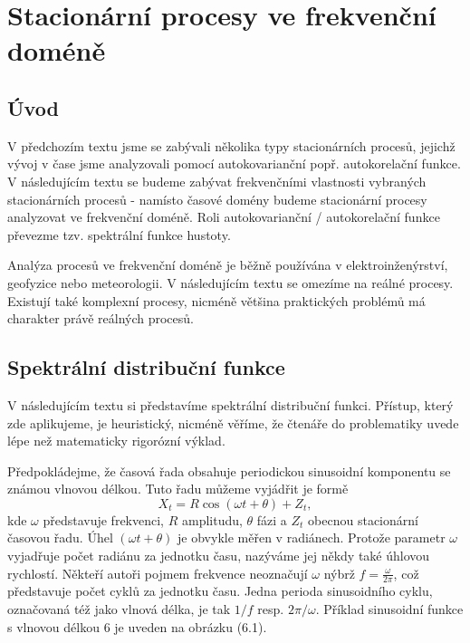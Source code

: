 \chapter{Stacionární procesy ve frekvenční doméně}

\section{Úvod}

V předchozím textu jsme se zabývali několika typy stacionárních procesů, jejichž vývoj v čase jsme analyzovali pomocí autokovarianční popř. autokorelační funkce. V následujícím textu se budeme zabývat frekvenčními vlastnosti vybraných stacionárních procesů - namísto časové domény budeme stacionární procesy analyzovat ve frekvenční doméně. Roli autokovarianční / autokorelační funkce převezme tzv. spektrální funkce hustoty.

Analýza procesů ve frekvenční doméně je běžně používána v elektroinženýrství, geofyzice nebo meteorologii. V následujícím textu se omezíme na reálné procesy. Existují také komplexní procesy, nicméně většina praktických problémů má charakter právě reálných procesů.

\section{Spektrální distribuční funkce}

V následujícím textu si představíme spektrální distribuční funkci. Přístup, který zde aplikujeme, je heuristický, nicméně věříme, že čtenáře do problematiky uvede lépe než matematicky rigorózní výklad.

Předpokládejme, že časová řada obsahuje periodickou sinusoidní komponentu se známou vlnovou délkou. Tuto řadu můžeme vyjádřit je formě
\begin{equation}
X_t = R \cos(\omega t + \theta) + Z_t,
\end{equation}
kde $\omega$ představuje frekvenci, $R$ amplitudu, $\theta$ fázi a $Z_t$ obecnou stacionární časovou řadu. Úhel $(\omega t + \theta)$ je obvykle měřen v radiánech. Protože parametr $\omega$ vyjadřuje počet radiánu za jednotku času, nazýváme jej někdy také úhlovou rychlostí. Někteří autoři pojmem frekvence neoznačují $\omega$ nýbrž $f = \frac{\omega}{2 \pi}$, což představuje počet cyklů za jednotku času. Jedna perioda sinusoidního cyklu, označovaná též jako vlnová délka, je tak $1/f$ resp. $2\pi/ \omega$. Příklad sinusoidní funkce s vlnovou délkou 6 je uveden na obrázku (6.1).

